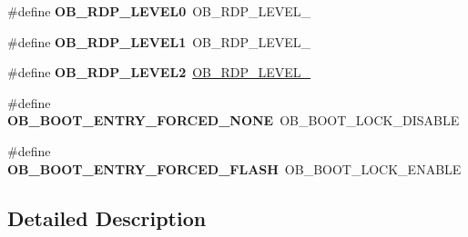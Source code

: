 \begin{DoxyCompactItemize}
\item 
\mbox{\label{group___h_a_l___f_l_a_s_h___aliased___defines_ga7339a05119a474a7bde67e9e500d38cb}} 
\#define {\bfseries O\+B\+\_\+\+R\+D\+P\+\_\+\+L\+E\+V\+E\+L0}~O\+B\+\_\+\+R\+D\+P\+\_\+\+L\+E\+V\+E\+L\+\_
\item 
\mbox{\label{group___h_a_l___f_l_a_s_h___aliased___defines_ga7291ec039ae68ee1471af8ef3310d326}} 
\#define {\bfseries O\+B\+\_\+\+R\+D\+P\+\_\+\+L\+E\+V\+E\+L1}~O\+B\+\_\+\+R\+D\+P\+\_\+\+L\+E\+V\+E\+L\+\_
\item 
\mbox{\label{group___h_a_l___f_l_a_s_h___aliased___defines_gae591fa55ccad5cc27b322a5fba9d6ca1}} 
\#define {\bfseries O\+B\+\_\+\+R\+D\+P\+\_\+\+L\+E\+V\+E\+L2}~\mbox{\hyperlink{group___f_l_a_s_h_ex___option___bytes___read___protection_ga2262afca565429ce2808d835c49e5ee6}{O\+B\+\_\+\+R\+D\+P\+\_\+\+L\+E\+V\+E\+L\+\_}}
\item 
\mbox{\label{group___h_a_l___f_l_a_s_h___aliased___defines_ga666d4ab8a89488eaf7d2182abea35d52}} 
\#define {\bfseries O\+B\+\_\+\+B\+O\+O\+T\+\_\+\+E\+N\+T\+R\+Y\+\_\+\+F\+O\+R\+C\+E\+D\+\_\+\+N\+O\+NE}~O\+B\+\_\+\+B\+O\+O\+T\+\_\+\+L\+O\+C\+K\+\_\+\+D\+I\+S\+A\+B\+LE
\item 
\mbox{\label{group___h_a_l___f_l_a_s_h___aliased___defines_gaecdfae7720771db018195097858fff93}} 
\#define {\bfseries O\+B\+\_\+\+B\+O\+O\+T\+\_\+\+E\+N\+T\+R\+Y\+\_\+\+F\+O\+R\+C\+E\+D\+\_\+\+F\+L\+A\+SH}~O\+B\+\_\+\+B\+O\+O\+T\+\_\+\+L\+O\+C\+K\+\_\+\+E\+N\+A\+B\+LE
\end{DoxyCompactItemize}


\subsection{Detailed Description}
